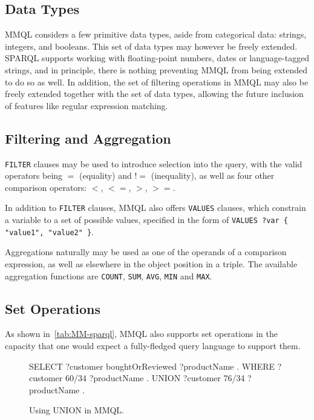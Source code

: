 \subsection{Data Types}

MMQL considers a few primitive data types, aside from categorical data: strings, integers, and booleans.
This set of data types may however be freely extended.
SPARQL supports working with floating-point numbers, dates or language-tagged strings, and in principle, there is nothing preventing MMQL from being extended to do so as well.
In addition, the set of filtering operations in MMQL may also be freely extended together with the set of data types, allowing the future inclusion of features like regular expression matching.

\subsection{Filtering and Aggregation}

\texttt{FILTER} clauses may be used to introduce selection into the query, with the valid operators being $=$ (equality) and $!=$ (inequality), as well as four other comparison operators: $<$, $<=$, $>$, $>=$.

In addition to \texttt{FILTER} clauses, MMQL also offers \texttt{VALUES} clauses, which constrain a variable to a set of possible values, specified in the form of \texttt{VALUES ?var \{ "value1", "value2" \}}.

Aggregations naturally may be used as one of the operands of a comparison expression, as well as elsewhere in the object position in a triple.
The available aggregation functions are \texttt{COUNT}, \texttt{SUM}, \texttt{AVG}, \texttt{MIN} and \texttt{MAX}.

\subsection{Set Operations}

As shown in~\cref{tab:MM-sparql}, MMQL also supports set operations in the capacity that one would expect a fully-fledged query language to support them.

\begin{figure}[ht]
\begin{code}
SELECT {
    ?customer boughtOrReviewed ?productName .
}
WHERE {
    {
        ?customer 60/34 ?productName .
    }
    UNION
    {
        ?customer 76/34 ?productName .
    }
}
\end{code}
\caption{Using UNION in MMQL.}\label{mmql:figure:union}
\end{figure}

